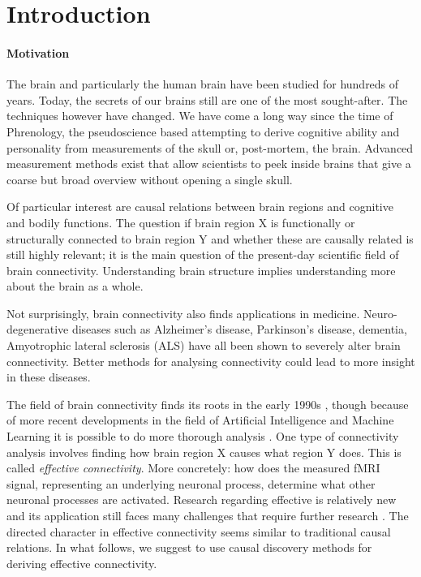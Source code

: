\documentclass[a4paper, 10pt, english, twocolumn]{article}
\title{\fontfamily{phv}\selectfont{Causal Discovery methods for Effective Connectivity}}
\author{
  \textbf{R. Janssen} - \href{mailto:ramon.janssen@student.ru.nl}{ramon.janssen@student.ru.nl} \\
  \textbf{T. de Ruijter} - \href{mailto:t.deruijter@student.ru.nl}{t.deruijter@student.ru.nl}\\
}
\date{\fontfamily{ptm}\selectfont{\small{\bfseries{\today - Radboud
Universiteit Nijmegen}}}\\[0.5cm]\rule{\linewidth}{0.3mm}}
\begin{document}
\maketitle

\begin{abstract}
\end{abstract}

\section{Introduction}

\paragraph{Motivation}
The brain and particularly the human brain have been studied for hundreds of years.
Today, the secrets of our brains still are one of the most sought-after.
The techniques however have changed.
We have come a long way since the time of Phrenology, the pseudoscience based attempting to derive cognitive ability and personality from measurements of the skull or, post-mortem, the brain.
Advanced measurement methods exist that allow scientists to peek inside brains that give a coarse but broad overview without opening a single skull.

Of particular interest are causal relations between brain regions and cognitive and bodily functions.
The question if brain region X is functionally or structurally connected to brain region Y and whether these are causally related is still highly relevant; it is the main question of the present-day scientific field of brain connectivity.
Understanding brain structure implies understanding more about the brain as a whole.

Not surprisingly, brain connectivity also finds applications in medicine.
Neuro-degenerative diseases such as Alzheimer's disease, Parkinson's disease, dementia, Amyotrophic lateral sclerosis (ALS) have all been shown to severely alter brain connectivity. %
Better methods for analysing connectivity could lead to more insight in these diseases.

The field of brain connectivity finds its roots in the early 1990s \cite{friston1993functional, friston1994}, though because of more recent developments in the field of Artificial Intelligence and Machine Learning it is possible to do more thorough analysis \cite{vandenheuvel2010}.
One type of connectivity analysis involves finding how brain region X causes what region Y does. This is called \emph{effective connectivity}.
More concretely: how does the measured fMRI signal, representing an underlying neuronal process, determine what other neuronal processes are activated.
Research regarding effective is relatively new and its application still faces many challenges that require further research \cite{ramsey2010}.
The directed character in effective connectivity seems similar to traditional causal relations.
In what follows, we suggest to use causal discovery methods for deriving effective connectivity.
\end{document}
